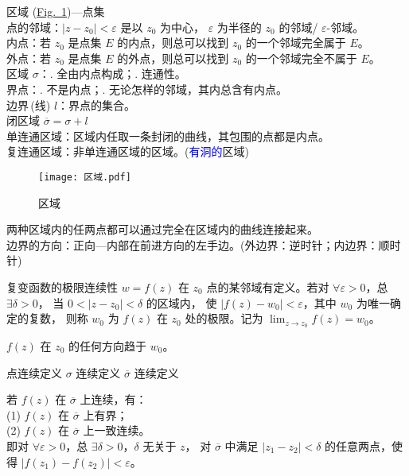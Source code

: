 \documentclass[12pt, a4paper, oneside, UTF8]{ctexbook}
\begin{document}
\noindent 区域 (\hyperref[fig:区域]{Fig.~\ref{fig:区域}})---点集\\
 点的邻域：$\left\lvert z-z_0\right\rvert<\varepsilon$ 是以 $z_0$ 为中心，
$\varepsilon$ 为半径的 $z_0$ 的邻域/ $\varepsilon$-邻域。\\
 内点：若 $z_0$ 是点集 $E$ 的内点，则总可以找到 $z_0$ 的一个邻域完全属于 $E$。\\
 外点：若 $z_0$ 是点集 $E$ 的外点，则总可以找到 $z_0$ 的一个邻域完全不属于 $E$。\\
 区域 $\sigma$：. 全由内点构成；. 连通性。\\
 界点：. 不是内点；. 无论怎样的邻域，其内总含有内点。\\
 边界\,(线) $l$：界点的集合。\\
 闭区域 $\overline{\sigma}=\sigma+l$\\
 单连通区域：区域内任取一条封闭的曲线，其包围的点都是内点。\\
 复连通区域：非单连通区域的区域。(\textcolor{blue}{有洞的}区域)\\
\begin{figure}
    \centering
    \texttt{[image: 区域.pdf]}
    \caption{\label{fig:区域} 区域}
\end{figure}
 两种区域内的任两点都可以通过完全在区域内的曲线连接起来。\\
边界的方向：正向---内部在前进方向的左手边。(外边界：逆时针；内边界：顺时针)

\begin{defn}{复变函数的极限}{连续性}
    $w=f(z)$ 在 $z_0$ 点的某邻域有定义。若对 $\forall \varepsilon >0$，总 $\exists \delta >0$，
    当 $0<\left\lvert z-z_0\right\rvert<\delta$ 的区域内，
    使 $\left\lvert f(z)-w_0\right\rvert<\varepsilon$，其中 $w_0$ 为唯一确定的复数，
    则称 $w_0$ 为 $f(z)$ 在 $z_0$ 处的极限。记为 $\lim_{z\rightarrow z_0}f(z)=w_0$。
\end{defn}
\begin{rmk}{}
    $f(z)$ 在 $z_0$ 的任何方向趋于 $w_0$。
\end{rmk}
点连续定义 \rightarrow $\sigma$ 连续定义 \rightarrow $\overline{\sigma}$ 连续定义

\noindent 若 $f(z)$ 在 $\overline{\sigma}$ 上连续，有：\\
(1) $f(z)$ 在 $\overline{\sigma}$ 上有界；\\
(2) $f(z)$ 在 $\overline{\sigma}$ 上一致连续。\\
即对 $\forall \varepsilon >0$，总 $\exists \delta >0$，$\delta$ 无关于 $z$，
对 $\overline{\sigma}$ 中满足 $\left\lvert z_1-z_2\right\rvert<\delta$
的任意两点，使得 $\left\lvert f(z_1)-f(z_2)\right\rvert<\varepsilon$。
\end{document}
